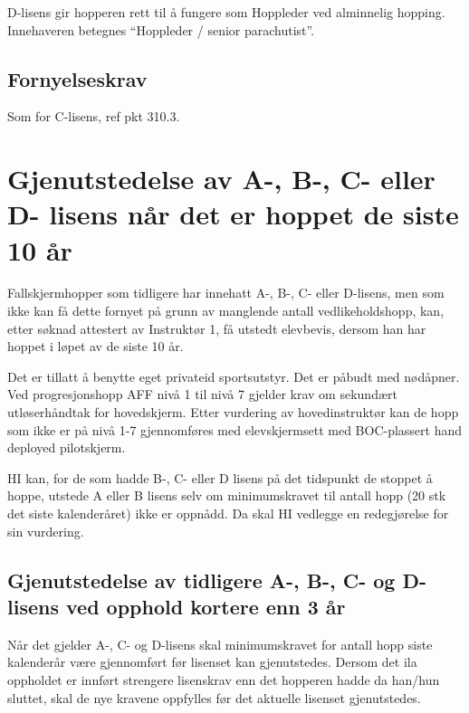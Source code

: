 D-lisens gir hopperen rett til å fungere som Hoppleder ved alminnelig hopping. Innehaveren betegnes ``Hoppleder / senior parachutist''.

\subsection{Fornyelseskrav}
Som for C-lisens, ref pkt 310.3.

\section{Gjenutstedelse av A-, B-, C- eller D- lisens når det er hoppet de siste 10 år}
Fallskjermhopper som tidligere har innehatt A-, B-, C- eller D-lisens, men som ikke kan få dette fornyet på grunn av manglende antall vedlikeholdshopp, kan, etter søknad attestert av Instruktør 1, få utstedt elevbevis, dersom han har hoppet i løpet av de siste 10 år.

Det er tillatt å benytte eget privateid sportsutstyr. Det er påbudt med nødåpner. Ved progresjonshopp AFF nivå 1 til nivå 7 gjelder krav om sekundært utløserhåndtak for hovedskjerm. Etter vurdering av hovedinstruktør kan de hopp som ikke er på nivå 1-7 gjennomføres med elevskjermsett med BOC-plassert hand deployed pilotskjerm.

HI kan, for de som hadde B-, C- eller D lisens på det tidspunkt de stoppet å hoppe, utstede A eller B lisens selv om minimumskravet til antall hopp (20 stk det siste kalenderåret) ikke er oppnådd. Da skal HI vedlegge en redegjørelse for sin vurdering.

\subsection{Gjenutstedelse av tidligere A-, B-, C- og D-lisens ved opphold kortere enn 3 år}
Når det gjelder A-, C- og D-lisens skal minimumskravet for antall hopp siste kalenderår være gjennomført før lisenset kan gjenutstedes. Dersom det ila oppholdet er innført strengere lisenskrav enn det hopperen hadde da han/hun sluttet, skal de nye kravene oppfylles før det aktuelle lisenset gjenutstedes.

